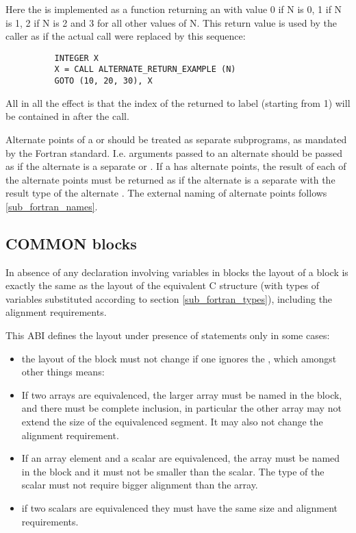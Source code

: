 Here the  is implemented as
a function returning an  with value 0 if N is 0, 1 if N is 1,
2 if N is 2 and 3 for all other values of N.  This return value is used by
the caller as if the actual call were replaced by this sequence:
\begin{footnotesize}
\begin{verbatim}
          INTEGER X
          X = CALL ALTERNATE_RETURN_EXAMPLE (N)
          GOTO (10, 20, 30), X
\end{verbatim}
\end{footnotesize}

All in all the effect is that the index of the returned to label (starting
from 1) will be contained in \RAX after the call.

Alternate  points of a  or 
should be treated as separate subprograms, as mandated by the Fortran
standard.  I.e. arguments passed to an alternate  should be passed
as if the alternate  is a separate  or
.  If a  has alternate  points,
the result of each of the alternate  points must be returned
as if the alternate  is a separate  with the
result type of the alternate .  The external naming of alternate
 points follows \ref{sub_fortran_names}.

\subsection{COMMON blocks}
In absence of any  declaration involving variables
in  blocks the layout of a 
 block is exactly the same as the layout of the equivalent C
structure (with types of variables substituted according to section
\ref{sub_fortran_types}), including the alignment requirements.

This ABI defines the layout under presence of  statements only
in some cases:
\begin{itemize}
\item the layout of the  block must not change if one ignores
      the , which amongst other things means:
\item If two arrays are equivalenced, the larger array must be named in
      the  block, and there must be complete inclusion,
      in particular the other array may not extend the size of the 
      equivalenced segment.  It may also not change the alignment
      requirement.
\item If an array element and a scalar are equivalenced, the array must be
      named in the  block and it must not be smaller than
      the scalar.  The type of the scalar must not require bigger alignment
      than the array.
\item if two scalars are equivalenced they must have the same size and
      alignment requirements.
\end{itemize}

